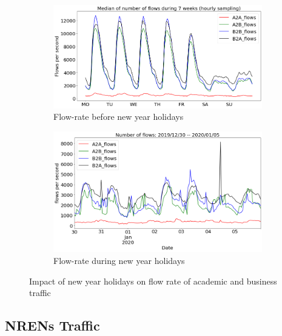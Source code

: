 \documentclass[10pt, journal, letterpaper]{IEEEtran}
\newcommand\linearFigSze{0.48}
\begin{document}
\begin{figure}
    \begin{subfigure}{\linearFigSze\textwidth}
          \centering
          \includegraphics[width=\columnwidth]{img/BCH_acaBus_fps.png}
          \caption{Flow-rate before new year holidays}
          \label{fig:BCH_acaBus_fps}
    \end{subfigure}
    \begin{subfigure}{\linearFigSze\textwidth}
          \centering
          \includegraphics[width=\columnwidth]{img/CH2_acaBus_fps.png}
          \caption{Flow-rate during new year holidays}
          \label{fig:CH_acaBus_fps}
    \end{subfigure}
    \caption{Impact of new year holidays on flow rate of academic and business traffic}
    \label{fig:flowrate_acaBus_BCH_CH}
\end{figure}

\subsection{NRENs Traffic}
\end{document}
